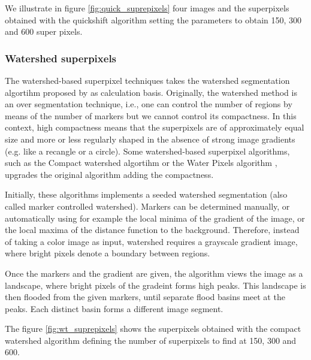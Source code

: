 We illustrate in figure \ref{fig:quick_suprepixels} four images and the superpixels obtained with the quickshift algorithm setting the parameters to obtain 150, 300 and 600 super pixels. 


\subsubsection{Watershed superpixels}%
The watershed-based superpixel techniques takes the watershed segmentation algortihm proposed by \citep{Meyer:ICIP:1992} as calculation basis. Originally, the watershed method is an over segmentation technique, i.e., one can control the number of regions by means of the number of markers but we cannot control its compactness.  In this context, high compactness means that the superpixels are of approximately equal size and more or less regularly shaped in the absence of strong image gradients (e.g. like a recangle or a circle). Some watershed-based superpixel algorithms, such as the Compact watershed algortihm \citep{Neubert.Protzel:ICPR:2014} or the Water Pixels algorithm \citep{Machairas.Faessel.ea:IP:2015}, upgrades the original algorithm adding the compactness. 

Initially, these algorithms implements a seeded watershed segmentation (also called marker controlled watershed). Markers can be determined manually, or automatically using for example the local minima of the gradient of the image, or the local maxima of the distance function to the background. Therefore, instead of taking a color image as input, watershed requires a grayscale gradient image, where bright pixels denote a boundary between regions. 

Once the markers and the gradient are given, the algorithm views the image as a landscape, where bright pixels of the gradeint forms high peaks. This landscape is then flooded from the given markers, until separate flood basins meet at the peaks. Each distinct basin forms a different image segment.

The figure \ref{fig:wt_suprepixels} shows the superpixels obtained with the compact watershed algorithm \citep{Neubert.Protzel:ICPR:2014} defining the number of superpixels to find at 150, 300 and 600.


